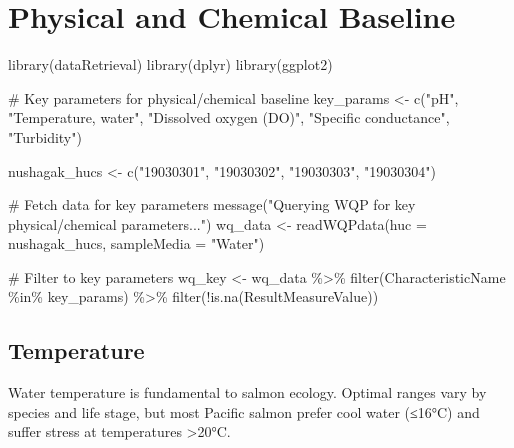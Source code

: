 \documentclass[
  letterpaper,
]{scrbook}
\newenvironment{Shaded}{\begin{snugshade}}{\end{snugshade}}
\newcommand{\AttributeTok}[1]{\textcolor[rgb]{0.40,0.45,0.13}{#1}}
\newcommand{\CommentTok}[1]{\textcolor[rgb]{0.37,0.37,0.37}{#1}}
\newcommand{\FunctionTok}[1]{\textcolor[rgb]{0.28,0.35,0.67}{#1}}
\newcommand{\NormalTok}[1]{\textcolor[rgb]{0.00,0.23,0.31}{#1}}
\newcommand{\OtherTok}[1]{\textcolor[rgb]{0.00,0.23,0.31}{#1}}
\newcommand{\SpecialCharTok}[1]{\textcolor[rgb]{0.37,0.37,0.37}{#1}}
\newcommand{\StringTok}[1]{\textcolor[rgb]{0.13,0.47,0.30}{#1}}
\begin{document}
\chapter{Physical and Chemical
Baseline}\label{physical-and-chemical-baseline}

\begin{Shaded}
\begin{Highlighting}[]
\FunctionTok{library}\NormalTok{(dataRetrieval)}
\FunctionTok{library}\NormalTok{(dplyr)}
\FunctionTok{library}\NormalTok{(ggplot2)}

\CommentTok{\# Key parameters for physical/chemical baseline}
\NormalTok{key\_params }\OtherTok{\textless{}{-}} \FunctionTok{c}\NormalTok{(}\StringTok{"pH"}\NormalTok{, }\StringTok{"Temperature, water"}\NormalTok{, }\StringTok{"Dissolved oxygen (DO)"}\NormalTok{, }
                \StringTok{"Specific conductance"}\NormalTok{, }\StringTok{"Turbidity"}\NormalTok{)}

\NormalTok{nushagak\_hucs }\OtherTok{\textless{}{-}} \FunctionTok{c}\NormalTok{(}\StringTok{"19030301"}\NormalTok{, }\StringTok{"19030302"}\NormalTok{, }\StringTok{"19030303"}\NormalTok{, }\StringTok{"19030304"}\NormalTok{)}

\CommentTok{\# Fetch data for key parameters}
\FunctionTok{message}\NormalTok{(}\StringTok{"Querying WQP for key physical/chemical parameters..."}\NormalTok{)}
\NormalTok{wq\_data }\OtherTok{\textless{}{-}} \FunctionTok{readWQPdata}\NormalTok{(}\AttributeTok{huc =}\NormalTok{ nushagak\_hucs, }\AttributeTok{sampleMedia =} \StringTok{"Water"}\NormalTok{)}

\CommentTok{\# Filter to key parameters}
\NormalTok{wq\_key }\OtherTok{\textless{}{-}}\NormalTok{ wq\_data }\SpecialCharTok{\%\textgreater{}\%}
  \FunctionTok{filter}\NormalTok{(CharacteristicName }\SpecialCharTok{\%in\%}\NormalTok{ key\_params) }\SpecialCharTok{\%\textgreater{}\%}
  \FunctionTok{filter}\NormalTok{(}\SpecialCharTok{!}\FunctionTok{is.na}\NormalTok{(ResultMeasureValue))}
\end{Highlighting}
\end{Shaded}

\section{Temperature}\label{temperature}

Water temperature is fundamental to salmon ecology. Optimal ranges vary
by species and life stage, but most Pacific salmon prefer cool water
(≤16°C) and suffer stress at temperatures \textgreater20°C.
\end{document}
